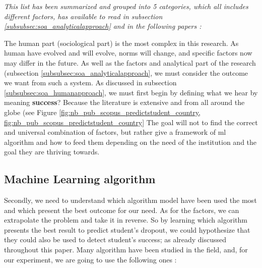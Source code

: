 \documentclass[../main.tex]{subfiles}
\begin{document}
\textit{This list has been summarized and grouped into 5 categories, which all includes different factors, has available to read in subsection \ref{subsubsec:soa_analyticalapproach} and in the following papers : 
\cite{opazo_analysis_2021,tinto_dropout_1975,caspersen_teachers_2015,lidia_problema_2006,bejarano_caso_2017,sinchi_acceso_2018,cavero_voluntad_2011,velasco_alisis_nodate}}

The human part (sociological part) is the most complex in this research. As human have evolved and will evolve, norms will change, and specific factors now may differ in the future. 
As well as the factors and analytical part of the research (subsection \ref{subsubsec:soa_analyticalapproach}, we must consider the outcome we want from such a system. As discussed in subsection \ref{subsubsec:soa_humanapproach}, we must first begin by defining what we hear by meaning \textbf{success}? Because the literature is extensive and from all around the globe (see Figure \ref{fig:nb_pub_scopus_predictstudent_country, fig:nb_pub_scopus_predictstudent_country}
The goal will not to find the correct and universal combination of factors, but rather give a framework of \acrshort{ml} algorithm and how to feed them depending on the need of the institution and the goal they are thriving towards.

\subsection{Machine Learning algorithm}
\label{subsec:analysis_mlalgo}
Secondly, we need to understand which algorithm model have been used the most and which present the best outcome for our need. As for the factors, we can extrapolate the problem and take it in reverse. So by learning which algorithm presents the best result to predict student's dropout, we could hypothesize that they could also be used to detect student's success; as already discussed throughout this paper. Many algorithm have been studied in the field, and, for our experiment, we are going to use the following ones : 
\end{document}
